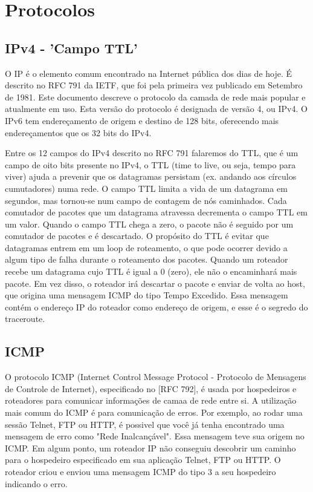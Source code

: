 \documentclass[
	article,			%
	11pt,				%
	oneside,			%
	a4paper,			%
	english,			%
	brazil,				%
	sumario=tradicional
	]{abntex2}
\begin{document}
\section{Protocolos}

\subsection{IPv4 - 'Campo TTL'}\label{sec:IPv4}
O IP é o elemento comum encontrado na Internet pública dos dias de hoje. É descrito no RFC 791 da IETF, que foi pela primeira vez publicado em Setembro de 1981. Este documento descreve o protocolo da camada de rede mais popular e atualmente em uso. Esta versão do protocolo é designada de versão 4, ou IPv4. O IPv6 tem endereçamento de origem e destino de 128 bits, oferecendo mais endereçamentos que os 32 bits do IPv4.

Entre os 12 campos do IPv4 descrito no RFC 791 falaremos do TTL, que é um campo de oito bits presente no IPv4, o TTL (time to live, ou seja, tempo para viver) ajuda a prevenir que os datagramas persistam (ex. andando aos círculos cumutadores) numa rede. O campo TTL limita a vida de um datagrama em segundos, mas tornou-se num campo de contagem de nós caminhados. Cada comutador de pacotes que um datagrama atravessa decrementa o campo TTL em um valor. Quando o campo TTL chega a zero, o pacote não é seguido por um comutador de pacotes e é descartado.
O propósito do TTL é evitar que datagramas entrem em um loop de roteamento, o que pode ocorrer devido a algum tipo de falha durante o roteamento dos pacotes. Quando um roteador recebe um datagrama cujo TTL é igual a 0 (zero), ele não o encaminhará mais pacote. Em vez disso, o roteador irá descartar o pacote e enviar de volta ao host, que origina uma mensagem ICMP do tipo Tempo Excedido. Essa mensagem contém o endereço IP do roteador como endereço de origem, e esse é o segredo do traceroute.\cite{boson}


\subsection{ICMP} \label{sec:ICMP}
 O protocolo ICMP (Internet Control Message Protocol - Protocolo de Mensagens de Controle de Internet), especificado no [RFC 792], é usada por hospedeiros e roteadores para comunicar informaç\~oes de camaa de rede entre si. A utilização mais comum do ICMP é para comunicação de erros. Por exemplo, ao rodar uma sessão Telnet, FTP ou HTTP, é possivel que você já tenha encontrado uma mensagem de erro como "Rede Inalcançável". Essa mensagem teve sua origem no ICMP. Em algum ponto, um roteador IP não conseguiu descobrir um caminho para o hospedeiro especificado em sua aplicação Telnet, FTP ou HTTP. O roteador criou e enviou uma mensagem ICMP do tipo 3 a seu hospedeiro indicando o erro.
 
\end{document}
